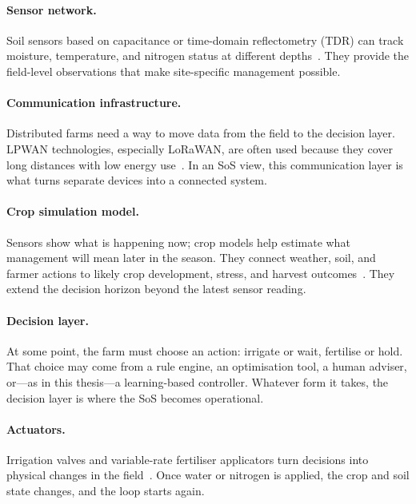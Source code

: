 \paragraph{Sensor network.}
Soil sensors based on capacitance or time-domain reflectometry (TDR) can track
moisture, temperature, and nitrogen status at different
depths~\cite{hayat2025iot, jadhav2023smartfarming}. They provide the field-level
observations that make site-specific management possible.

\paragraph{Communication infrastructure.}
Distributed farms need a way to move data from the field to the decision layer.
LPWAN technologies, especially LoRaWAN, are often used because they cover long
distances with low energy use~\cite{codeluppi2020lorafarm, jadhav2023smartfarming}.
In an SoS view, this communication layer is what turns separate devices into a
connected system.

\paragraph{Crop simulation model.}
Sensors show what is happening now; crop models help estimate what management
will mean later in the season. They connect weather, soil, and farmer actions to
likely crop development, stress, and harvest
outcomes~\cite{boote2019cropmodelling, hoogenboom2019dssat}. They extend the
decision horizon beyond the latest sensor reading.

\paragraph{Decision layer.}
At some point, the farm must choose an action: irrigate or wait, fertilise or
hold. That choice may come from a rule engine, an optimisation tool, a human
adviser, or---as in this thesis---a learning-based controller. Whatever form it
takes, the decision layer is where the SoS becomes operational.

\paragraph{Actuators.}
Irrigation valves and variable-rate fertiliser applicators turn decisions into
physical changes in the field~\cite{hayat2025iot}. Once water or nitrogen is
applied, the crop and soil state changes, and the loop starts again.


